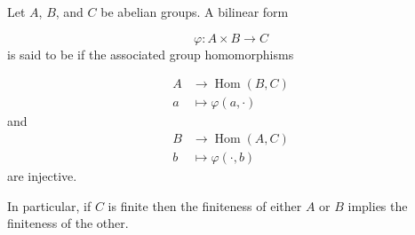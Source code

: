 \documentclass[12pt]{article}
\begin{document}
Let $A$, $B$, and $C$ be abelian groups. A bilinear form

$$
\varphi: A\times B \rightarrow C
$$
is said to be \emph{} if the associated group homomorphisms

\begin{align*}
A &\rightarrow \operatorname{Hom}(B,C)\\
a &\mapsto \varphi(a,\cdot)
\end{align*}
and
\begin{align*}
B &\rightarrow \operatorname{Hom}(A,C)\\
b &\mapsto \varphi(\cdot,b)
\end{align*}
are injective. 

In particular, if $C$ is finite then the finiteness of either $A$ or $B$ implies the finiteness of the other.
\end{document}
